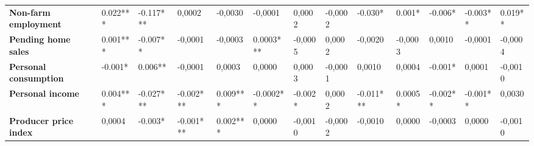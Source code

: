 \begin{landscape}
\begin{table}[]
{\begin{tabular}{@{}lllllllllllll@{}}
\textbf{Non-farm employment}      & 0.022***                                & -0.117***                               & 0,0002                                  & -0,0030                                 & -0,0001                                 & 0,0002                                  & -0,0002                                 & -0.030*                                 & 0.001*                                  & -0.006*                                 & -0.003**                                & 0.019**                                 \\
\textbf{Pending home sales}       & 0.001***                                & -0.007**                                & -0,0001                                 & -0,0003                                 & 0.0003***                               & -0,0005                                 & 0,0002                                  & -0,0020                                 & -0,0003                                 & 0,0010                                  & -0,0001                                 & -0,0004                                 \\
\textbf{Personal consumption}     & -0.001*                                 & 0.006**                                 & -0,0001                                 & 0,0003                                  & 0,0000                                  & 0,0003                                  & -0,0001                                 & 0,0010                                  & 0,0004                                  & -0.001*                                 & 0,0001                                  & -0,0010                                 \\
\textbf{Personal income}          & 0.004***                                & -0.027***                               & -0.002***                               & 0.009***                                & -0.0002**                               & -0.002*                                 & 0,0002                                  & -0.011***                               & 0.0005*                                 & -0.002**                                & -0.001**                                & 0,0030                                  \\
\textbf{Producer price index}     & 0,0004                                  & -0.003*                                 & -0.001***                               & 0.002***                                & 0,0000                                  & -0,0010                                 & -0,0002                                 & -0,0010                                 & 0,0000                                  & -0,0003                                 & 0,0000                                  & -0,0010                                 \\

\end{tabular}}
\end{table}
\end{landscape}
